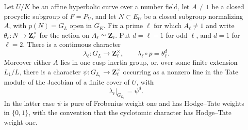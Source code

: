 \begin{lemma}
\label{A:normalizer-character-descent}
Let $U/K$ be an affine hyperbolic curve over a number
field, let $A\ne1$ be a closed procyclic subgroup of
$F=P_U$, and let $N\subset E_U$ be a closed subgroup
normalizing $A$, with $p(N)=G_L$ open in $G_K$.
Fix a prime $\ell$ for which $A_\ell\ne1$ and write
$\theta_\ell:N\to\mathbf Z_\ell^\times$ for the action
on $A_\ell\simeq\mathbf Z_\ell$. Put
$d=\ell-1$ for odd $\ell$, and $d=1$ for $\ell=2$.
There is a continuous character
\[
 \lambda_\ell:G_L\longrightarrow\mathbf Z_\ell^\times,
 \qquad \lambda_\ell\circ p=\theta_\ell^d.
\]
Moreover either $A$ lies in one cusp inertia group, or,
over some finite extension $L_1/L$, there is a character
$\psi:G_{L_1}\to\mathbf Z_\ell^\times$ occurring as
a nonzero line in the Tate module of the Jacobian of
a finite cover of $U$, with
\[
              \lambda_\ell|_{G_{L_1}}=\psi^d.
\]
In the latter case $\psi$ is pure of Frobenius weight one
and has Hodge--Tate weights in $\{0,1\}$, with the
convention that the cyclotomic character has
Hodge--Tate weight one.
\end{lemma}
